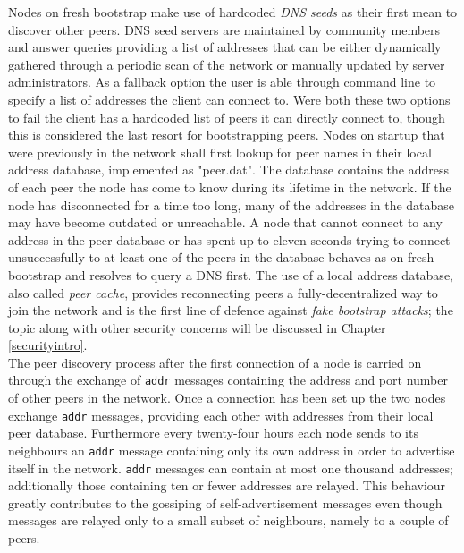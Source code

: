 \documentclass[12pt, letterpaper, twoside]{article}
\begin{document}
Nodes on fresh bootstrap make use of hardcoded \emph{DNS seeds} as their first mean to discover other peers. DNS seed servers are maintained by community members and answer queries providing a list of addresses that can be either dynamically gathered through a periodic scan of the network or manually updated by server administrators. As a fallback option the user is able through command line to specify a list of addresses the client can connect to. Were both these two options to fail the client has a hardcoded list of peers it can directly connect to, though this is considered the last resort for bootstrapping peers. Nodes on startup that were previously in the network shall first lookup for peer names in their local address database, implemented as "peer.dat". The database contains the address of each peer the node has come to know during its lifetime in the network. If the node has disconnected for a time too long, many of the addresses in the database may have become outdated or unreachable. A node that cannot connect to any address in the peer database or has spent up to eleven seconds trying to connect unsuccessfully to at least one of the peers in the database behaves as on fresh bootstrap and resolves to query a DNS first. The use of a local address database, also called \emph{peer cache}, provides reconnecting peers a fully-decentralized way to join the network and is the first line of defence against \emph{fake bootstrap attacks}; the topic along with other security concerns will be discussed in Chapter \ref{securityintro}.\\
The peer discovery process after the first connection of a node is carried on through the exchange of \texttt{addr} messages containing the address and port number of other peers in the network. Once a connection has been set up the two nodes exchange \texttt{addr} messages, providing each other with addresses from their local peer database. Furthermore every twenty-four hours each node sends to its neighbours an \texttt{addr} message containing only its own address in order to advertise itself in the network. \texttt{addr} messages can contain at most one thousand addresses; additionally those containing ten or fewer addresses are relayed. This behaviour greatly contributes to the gossiping of self-advertisement messages even though messages are relayed only to a small subset of neighbours, namely to a couple of peers.
\end{document}
